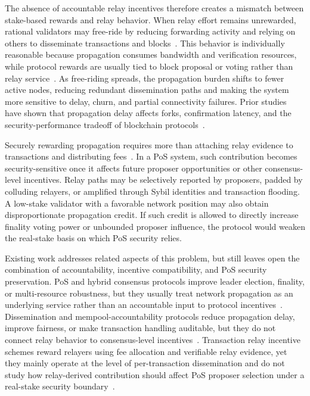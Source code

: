 \documentclass[lettersize,journal]{IEEEtran}
\begin{document}
The absence of accountable relay incentives therefore creates a mismatch between stake-based rewards and relay behavior.
When relay effort remains unrewarded, rational validators may free-ride by reducing forwarding activity and relying on others to disseminate transactions and blocks~\cite{babaioff2012bitcoin,ersoy2017transaction}.
This behavior is individually reasonable because propagation consumes bandwidth and verification resources, while protocol rewards are usually tied to block proposal or voting rather than relay service~\cite{naumenko2019erlay,kang2019incentivizing}.
As free-riding spreads, the propagation burden shifts to fewer active nodes, reducing redundant dissemination paths and making the system more sensitive to delay, churn, and partial connectivity failures.
Prior studies have shown that propagation delay affects forks, confirmation latency, and the security-performance tradeoff of blockchain protocols~\cite{decker2013information,croman2016scaling,gervais2016security,pass2017analysis}.

Securely rewarding propagation requires more than attaching relay evidence to transactions and distributing fees~\cite{dai2026txtail}.
In a PoS system, such contribution becomes security-sensitive once it affects future proposer opportunities or other consensus-level incentives.
Relay paths may be selectively reported by proposers, padded by colluding relayers, or amplified through Sybil identities and transaction flooding.
A low-stake validator with a favorable network position may also obtain disproportionate propagation credit.
If such credit is allowed to directly increase finality voting power or unbounded proposer influence, the protocol would weaken the real-stake basis on which PoS security relies.

Existing work addresses related aspects of this problem, but still leaves open the combination of accountability, incentive compatibility, and PoS security preservation.
PoS and hybrid consensus protocols improve leader election, finality, or multi-resource robustness, but they usually treat network propagation as an underlying service rather than an accountable input to protocol incentives~\cite{liu2024bulwark,fitzi2022minotaur}.
Dissemination and mempool-accountability protocols reduce propagation delay, improve fairness, or make transaction handling auditable, but they do not connect relay behavior to consensus-level incentives~\cite{nasrulin2023lo,yahyaoui2025hermes,dai2025lowlatency}.
Transaction relay incentive schemes reward relayers using fee allocation and verifiable relay evidence, yet they mainly operate at the level of per-transaction dissemination and do not study how relay-derived contribution should affect PoS proposer selection under a real-stake security boundary~\cite{wang2023dualauction}.
\end{document}

